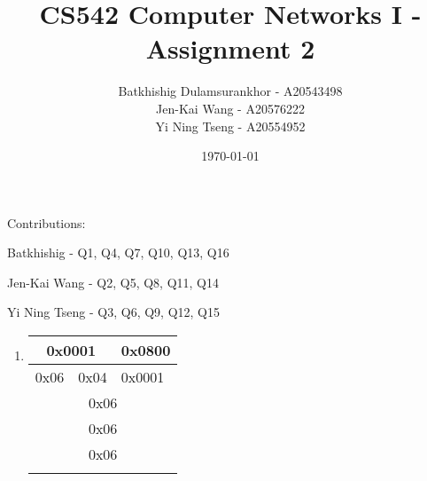 \documentclass{article}
\title{CS542 Computer Networks I - Assignment 2}
\author{
  Batkhishig Dulamsurankhor - A20543498 \\
  Jen-Kai	Wang - A20576222 \\
  Yi Ning	Tseng - A20554952 \\
}
\date{\today} %
\begin{document}
\maketitle

Contributions:

Batkhishig - Q1, Q4, Q7, Q10, Q13, Q16

Jen-Kai	Wang - Q2, Q5, Q8, Q11, Q14

Yi Ning	Tseng - Q3, Q6, Q9, Q12, Q15

\begin{enumerate}
  \item 
  \begin{tabular}{ | m{4cm} | m{4cm} | m{8cm} | } 
    \hline
    \multicolumn{2}{|c|}{0x0001} & \multicolumn{1}{c|}{0x0800}  \\
    \hline
    \multicolumn{1}{|c|}{0x06} & \multicolumn{1}{c|}{0x04} & 0x0001\\ 
    \hline
    \multicolumn{3}{|c|}{0x06} \\
    \hline
    \multicolumn{3}{|c|}{0x06} \\
    \hline
    \multicolumn{3}{|c|}{0x06} \\
    \hline
    & & \\
    \hline
\end{tabular}
\end{enumerate}
\end{document}
